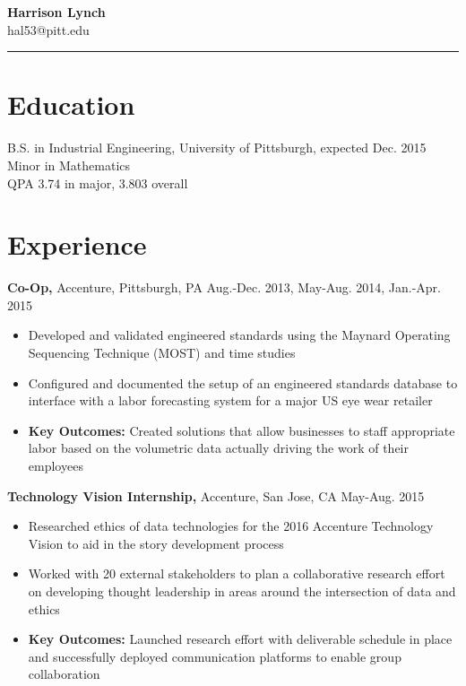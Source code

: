 \documentclass[margin]{res}
\begin{document}
 
 
\begin{flushleft}

\textbf{\Huge{Harrison Lynch}} \\
\large{hal53@pitt.edu} \vspace{6.5mm} \\
\rule{132mm}{0.2}
\vspace{-16mm}

\end{flushleft}

\begin{resume} 
 

\section{Education} 
B.S. in Industrial Engineering, University of Pittsburgh, expected Dec. 2015 \\
Minor in Mathematics \\
QPA 3.74 in major, 3.803 overall

 
\section{Experience}
 {\bf Co-Op,} Accenture, Pittsburgh, PA \hfill Aug.-Dec. 2013, May-Aug. 2014, Jan.-Apr. 2015
 \begin{itemize} \itemsep -2pt  %
 \item Developed and validated engineered standards using the Maynard Operating Sequencing Technique (MOST) and time studies
 \item Configured and documented the setup of an engineered standards database to interface with a labor forecasting system for a major US eye wear retailer
 \item \textbf{Key Outcomes:} Created solutions that allow businesses to staff appropriate labor based on the volumetric data actually driving the work of their employees
 \end{itemize}

{\bf Technology Vision Internship,} Accenture, San Jose, CA \hfill  May-Aug. 2015
\begin{itemize} \itemsep -2pt %
\item Researched ethics of data technologies for the 2016 Accenture Technology Vision to aid in the story development process
\item Worked with 20 external stakeholders to plan a collaborative research effort on developing thought leadership in areas around the intersection of data and ethics
\item \textbf{Key Outcomes:} Launched research effort with deliverable schedule in place and successfully deployed communication platforms to enable group collaboration
\end{itemize}


\end{resume}
\end{document}
